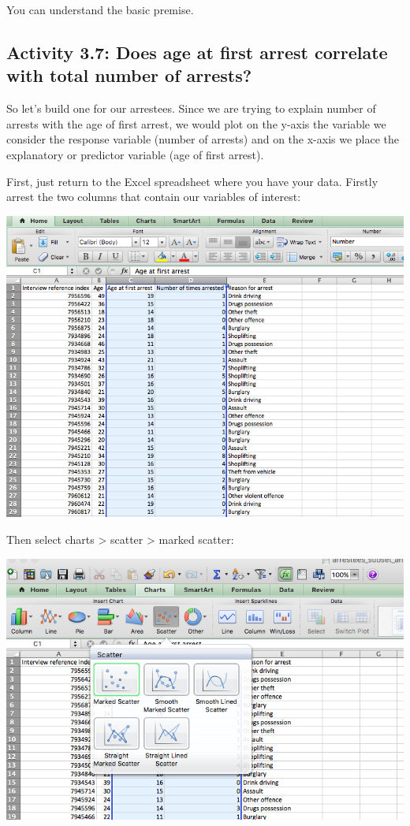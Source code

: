 \documentclass[
]{book}
\begin{document}
You can understand the basic premise.

\hypertarget{activity-3.7-does-age-at-first-arrest-correlate-with-total-number-of-arrests}{%
\subsection{Activity 3.7: Does age at first arrest correlate with total number of arrests?}\label{activity-3.7-does-age-at-first-arrest-correlate-with-total-number-of-arrests}}

So let's build one for our arrestees. Since we are trying to explain number of arrests with the age of first arrest, we would plot on the y-axis the variable we consider the response variable (number of arrests) and on the x-axis we place the explanatory or predictor variable (age of first arrest).

First, just return to the Excel spreadsheet where you have your data. Firstly arrest the two columns that contain our variables of interest:

\includegraphics{imgs/scatter_1.png}

Then select charts \textgreater{} scatter \textgreater{} marked scatter:

\includegraphics{imgs/scatter_2.png}
\end{document}

